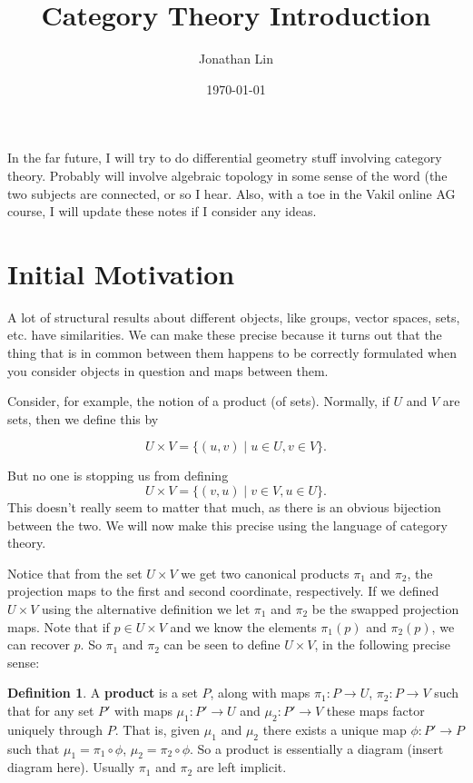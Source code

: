 \documentclass[12pt]{article}
\title{Category Theory Introduction}
\author{Jonathan Lin}
\date{\today}
\theoremstyle{plain}
\theoremstyle{definition}
\newtheorem{definition}{Definition}
\begin{document}
\maketitle

In the far future, I will try to do differential geometry stuff involving category theory. Probably will involve algebraic topology in some sense of the word (the two subjects are connected, or so I hear. Also, with a toe in the Vakil online AG course, I will update these notes if I consider any ideas.

\section{Initial Motivation}

A lot of structural results about different objects, like groups, vector spaces, sets, etc. have similarities. We can make these precise because it turns out that the thing that is in common between them happens to be correctly formulated when you consider objects in question and maps between them.

Consider, for example, the notion of a product (of sets). Normally, if $U$ and $V$ are sets, then we define this by

\[U \times V = \{(u, v) \mid u \in U, v \in V\}.\]

But no one is stopping us from defining 
\[U \times V = \{(v, u) \mid v \in V, u \in U\}.\]
This doesn't really seem to matter that much, as there is an obvious bijection between the two. We will now make this precise using the language of category theory.

Notice that from the set $U \times V$ we get two canonical products $\pi_1$ and $\pi_2$, the projection maps to the first and second coordinate, respectively. If we defined $U \times V$ using the alternative definition we let $\pi_1$ and $\pi_2$ be the swapped projection maps. Note that if $p \in U \times V$ and we know the elements $\pi_1(p)$ and $\pi_2(p)$, we can recover $p$. So $\pi_1$ and $\pi_2$ can be seen to define $U \times V$, in the following precise sense:
\begin{definition}
A \textbf{product} is a set $P$, along with maps $\pi_1: P \to U$, $\pi_2: P \to V$ such that for any set $P'$ with maps $\mu_1: P' \to U$ and $\mu_2: P' \to V$ these maps factor uniquely through $P$. That is, given $\mu_1$ and $\mu_2$ there exists a unique map $\phi: P' \to P$ such that $\mu_1 = \pi_1 \circ \phi$, $\mu_2 = \pi_2 \circ \phi$. So a product is essentially a diagram (insert diagram here). Usually $\pi_1$ and $\pi_2$ are left implicit.
\end{definition}
\end{document}
